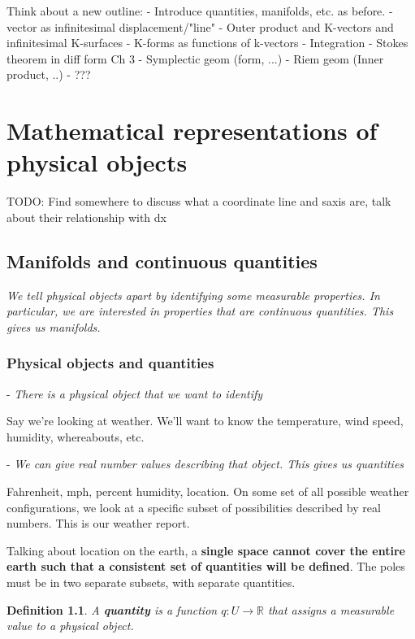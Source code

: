 \documentclass{book}
\newtheorem{defn}[equation]{Definition}
\begin{document}
\tableofcontents


Think about a new outline: 
- Introduce quantities, manifolds, etc. as before. 
- vector as infinitesimal displacement/"line"
- Outer product and K-vectors and infinitesimal K-surfaces
- K-forms as functions of k-vectors
- Integration
- Stokes theorem in diff form
Ch 3
- Symplectic geom (form, ...)
- Riem geom (Inner product, ..)
- ???


\chapter{Mathematical representations of physical objects}

TODO: Find somewhere to discuss what a coordinate line and saxis are, talk about their relationship with dx

\section{Manifolds and continuous quantities}
\emph{We tell physical objects apart by identifying some measurable properties. In particular, we are interested in properties that are continuous quantities. This gives us manifolds.}

\subsection{Physical objects and quantities}

- \emph{There is a physical object that we want to identify}

Say we're looking at weather. We'll want to know the temperature, wind speed, humidity, whereabouts, etc.

- \emph{We can give real number values describing that object. This gives us quantities}

Fahrenheit, mph, percent humidity, location.
On some set of all possible weather configurations, we look at a specific subset of possibilities described by real numbers. This is our weather report.  

Talking about location on the earth, a \textbf{single space cannot cover the entire earth such that a consistent set of quantities will be defined}. The poles must be in two separate subsets, with separate quantities. 

\begin{defn}
	A \textbf{quantity} is a function $q : U \to \mathbb{R}$ that assigns a measurable value to a physical object.
\end{defn}
\end{document}
